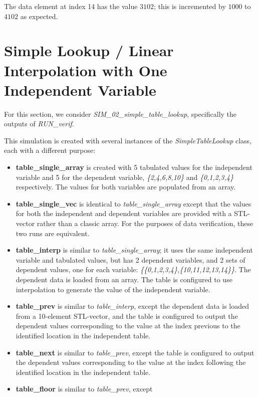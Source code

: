 \documentclass[11pt,fleqn]{report}
\begin{document}
The data element at index 14 has the value $3102$; this is incremented
by $1000$ to $4102$ as expected.


\section{ Simple Lookup / Linear Interpolation with One Independent Variable}
\label{sec:VV_Simple_Lookup}
For this section, we consider \textit{SIM\_02\_simple\_table\_lookup},
specifically the outputs of \textit{RUN\_verif}.

This simulation is created with several instances of the
\textit{SimpleTableLookup} class, each with a different purpose:
\begin{itemize}
  \item \textbf{table\_single\_array} is created with 5 tabulated values for the
        independent variable and 5 for the dependent variable, \textit
        {\{2,4,6,8,10\}} and \textit{\{0,1,2,3,4\}} respectively.  The
        values for both variables are populated from an array.
  \item \textbf{table\_single\_vec} is identical to
        \textit{table\_single\_array} except
        that the values for both the independent and dependent variables are
        provided with a STL-vector rather than a classic array.
        For the purposes of data verification, these two runs are equivalent.
  \item \textbf{table\_interp} is similar to \textit{table\_single\_array}; it
        uses the same independent variable and tabulated values, but has 2
        dependent variables, and 2 sets of dependent values, one for each
        variable: \textit{\{\{0,1,2,3,4\},\{10,11,12,13,14\}\}}.
        The dependent data is loaded from an array.
        The table is configured to use interpolation to generate
        the value of the independent variable.
  \item \textbf{table\_prev} is similar to \textit{table\_interp}, except
        the dependent data is loaded from a 10-element STL-vector, and the
        table is configured to output the dependent values corresponding to
        the value at the index previous to the identified location in the
        independent table.
  \item \textbf{table\_next} is similar to \textit{table\_prev}, except
        the table is configured to output the dependent values corresponding to
        the value at the index following the identified location in the
        independent table.
  \item \textbf{table\_floor} is similar to \textit{table\_prev}, except

\end{itemize}
\end{document}
